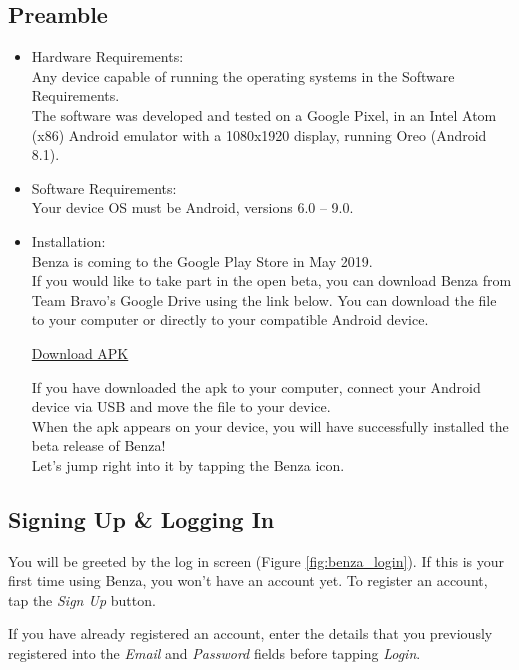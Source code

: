 \documentclass{article}
\begin{document}
    \subsection{Preamble}
    \begin{itemize}
        \item Hardware Requirements: \\
        Any device capable of running the operating systems in the Software Requirements. \\
        The software was developed and tested on a Google Pixel, in an Intel Atom (x86) Android emulator with a 1080x1920 display, running Oreo (Android 8.1).
        \item Software Requirements: \\
        Your device OS must be Android, versions 6.0 -- 9.0.
        \item Installation: \\
         Benza is coming to the Google Play Store in May 2019. \\[6pt]
    If you would like to take part in the open beta, you can download Benza from Team Bravo's Google Drive using the link below. You can download the file to your computer or directly to your compatible Android device.
    \begin{center}
        \href{https://drive.google.com/open?id=1TzMazfQU8_SMdWixVM0ivUeSUKwuJ4zb}{Download APK}
    \end{center}
    If you have downloaded the \acrshort{apk} to your computer, connect your Android device via USB and move the file to your device. \\[6pt]
    When the \acrshort{apk} appears on your device, you will have successfully installed the beta release of Benza! \\[6pt]
    Let's jump right into it by tapping the Benza icon.
    \end{itemize}

    \newpage
    \subsection{Signing Up \& Logging In}
    
    You will be greeted by the log in screen (Figure \ref{fig:benza_login}). If this is your first time using Benza, you won't have an account yet. To register an account, tap the \emph{Sign Up} button. \par
    
    If you have already registered an account, enter the details that you previously registered into the \emph{Email} and \emph{Password} fields before tapping \emph{Login}. \par
    
\end{document}
